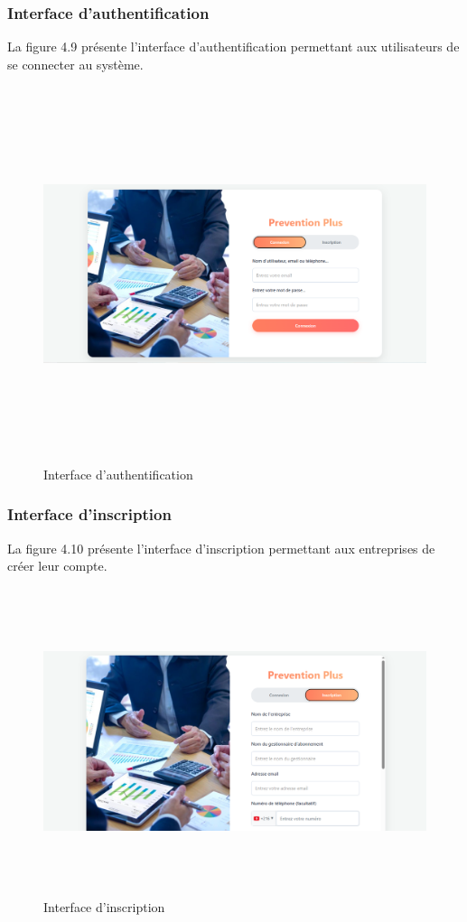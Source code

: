 \subsubsection{Interface d'authentification}
\noindent La figure 4.9 présente l'interface d'authentification permettant aux utilisateurs de se connecter au système.

\begin{figure}[H]
    \centering
    \includegraphics[width=17cm,height=11cm]{images/authpic.PNG}
    \caption{Interface d'authentification}
\end{figure}

\subsubsection{Interface d'inscription}
\noindent La figure 4.10 présente l'interface d'inscription permettant aux entreprises de créer leur compte.

\begin{figure}[H]
    \centering
    \includegraphics[width=15cm,height=9cm]{images/inscpic.PNG}
    \caption{Interface d'inscription}
\end{figure}


